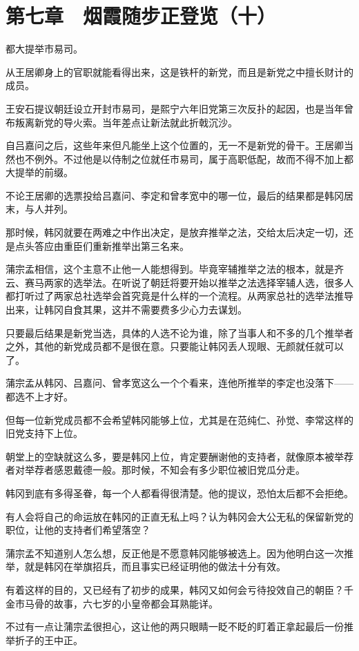 \section{第七章　烟霞随步正登览（十）}

都大提举市易司。

从王居卿身上的官职就能看得出来，这是铁杆的新党，而且是新党之中擅长财计的成员。

王安石提议朝廷设立开封市易司，是熙宁六年旧党第三次反扑的起因，也是当年曾布叛离新党的导火索。当年差点让新法就此折戟沉沙。

自吕嘉问之后，这些年来但凡能坐上这个位置的，无一不是新党的骨干。王居卿当然也不例外。不过他是以侍制之位就任市易司，属于高职低配，故而不得不加上都大提举的前缀。

不论王居卿的选票投给吕嘉问、李定和曾孝宽中的哪一位，最后的结果都是韩冈居末，与人并列。

那时候，韩冈就要在两难之中作出决定，是放弃推举之法，交给太后决定一切，还是点头答应由重臣们重新推举出第三名来。

蒲宗孟相信，这个主意不止他一人能想得到。毕竟宰辅推举之法的根本，就是齐云、赛马两家的选举法。在听说了朝廷将要开始以推举之法选择宰辅人选，很多人都打听过了两家总社选举会首究竟是什么样的一个流程。从两家总社的选举法推导出来，让韩冈自食其果，这并不需要费多少心力去谋划。

只要最后结果是新党当选，具体的人选不论为谁，除了当事人和不多的几个推举者之外，其他的新党成员都不是很在意。只要能让韩冈丢人现眼、无颜就任就可以了。

蒲宗孟从韩冈、吕嘉问、曾孝宽这么一个个看来，连他所推举的李定也没落下——都选不上才好。

但每一位新党成员都不会希望韩冈能够上位，尤其是在范纯仁、孙觉、李常这样的旧党支持下上位。

朝堂上的空缺就这么多，要是韩冈上位，肯定要酬谢他的支持者，就像原本被举荐者对举荐者感恩戴德一般。那时候，不知会有多少职位被旧党瓜分走。

韩冈到底有多得圣眷，每一个人都看得很清楚。他的提议，恐怕太后都不会拒绝。

有人会将自己的命运放在韩冈的正直无私上吗？认为韩冈会大公无私的保留新党的职位，让他的支持者们希望落空？

蒲宗孟不知道别人怎么想，反正他是不愿意韩冈能够被选上。因为他明白这一次推举，就是韩冈在举旗招兵，而且事实已经证明他的做法十分有效。

有着这样的目的，又已经有了初步的成果，韩冈又如何会亏待投效自己的朝臣？千金市马骨的故事，六七岁的小皇帝都会耳熟能详。

不过有一点让蒲宗孟很担心，这让他的两只眼睛一眨不眨的盯着正拿起最后一份推举折子的王中正。

